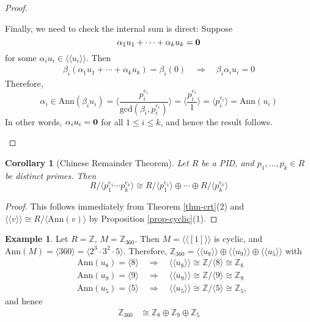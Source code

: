 \documentclass[11pt,openany]{book}
\theoremstyle{plain}
\newtheorem{corollary}[corollary]{Corollary}
\theoremstyle{definition}
\newtheorem{example}[example]{Example}
\theoremstyle{remark}
\begin{document}
\begin{proof}
\begin{enumerate}
        Finally, we need to check the internal sum is direct: Suppose $$\alpha_1u_1+\cdots+\alpha_ku_k= {\bf 0}$$ 
        for some $\alpha_iu_i\in\langle\langle u_i\rangle\rangle$. Then
        \begin{align*}
            \beta_i(\alpha_1u_1+\cdots+\alpha_ku_k)=\beta_i(0) \quad \Rightarrow \quad \beta_i\alpha_iu_i=0
        \end{align*}
            Therefore, 
            $$\alpha_i \in\mathrm{Ann}(\beta_iu_i) =\langle\frac{p_i^{e_i}}{\mathrm{gcd}(\beta_i , p_i^{e_i})}\rangle =\langle\frac{p_i^{e_i}}{1}\rangle =\langle p_i^{e_i}\rangle =\mathrm{Ann}(u_i)$$
         In other words, $\alpha_iu_i = {\bf 0}$ for all $1 \leq i \leq k$,  
        and hence the result follows.
    \end{enumerate}
\end{proof}

\begin{corollary}[Chinese Remainder Theorem] \label{cor-crt}
    Let $R$ be a PID, and $p_1, \dots, p_k \in R$ be distinct primes. Then 
    $$R/\langle p_1^{e_1} \cdots p_k^{e_k} \rangle  \cong R/\langle p_1^{e_1} \rangle \oplus \cdots \oplus R/\langle p_k^{e_k} \rangle$$
\end{corollary}
\begin{proof}
    This follows immediately from Theorem \ref{thm-crt}(2) and $\langle \langle v \rangle \rangle \cong R/\langle \mathrm{Ann}(v) \rangle$ by Proposition \ref{prop-cyclic}(1).
\end{proof}

\begin{example}
    Let $R=\mathbb{Z}$, $M=\mathbb{Z}_{360}$. Then $M=\langle\langle[1]\rangle\rangle$ is cyclic, and $\mathrm{Ann}(M)=\langle 360\rangle=\langle2^3\cdot 3^2\cdot5\rangle$. Therefore, $\mathbb{Z}_{360}=\langle\langle u_8\rangle\rangle\oplus\langle\langle u_9\rangle\rangle\oplus\langle\langle 
    u_5\rangle\rangle$ with
    \begin{align*}
        &\mathrm{Ann}(u_8)=\langle8\rangle \quad\Rightarrow\quad\langle\langle u_8\rangle\rangle\cong\mathbb{Z}/\langle8\rangle \cong\mathbb{Z}_8\\
        &\mathrm{Ann}(u_9)=\langle9\rangle \quad\Rightarrow\quad\langle\langle u_9\rangle\rangle\cong\mathbb{Z}/\langle9\rangle \cong\mathbb{Z}_9\\
        &\mathrm{Ann}(u_5)=\langle5\rangle \quad\Rightarrow\quad\langle\langle u_5\rangle\rangle\cong\mathbb{Z}/\langle5\rangle \cong\mathbb{Z}_5,
    \end{align*}and hence
    \begin{align*}
        \mathbb{Z}_{360} &\cong\mathbb{Z}_8\oplus\mathbb{Z}_9\oplus\mathbb{Z}_5
    \end{align*}
\end{example}
\end{document}
